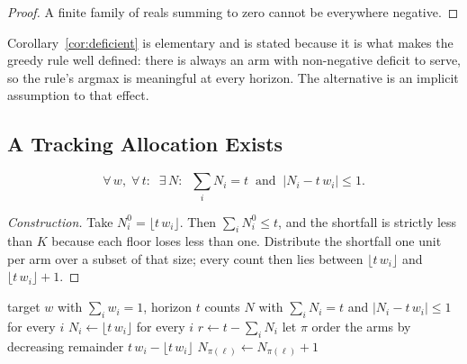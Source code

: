 \begin{proof}
A finite family of reals summing to zero cannot be everywhere negative.
\end{proof}


Corollary~\ref{cor:deficient} is elementary and is stated because it is what makes the greedy
rule well defined: there is always an arm with non-negative deficit to serve, so the rule's
argmax is meaningful at every horizon. The alternative is an implicit assumption to that
effect.

\subsection{A Tracking Allocation Exists}
\label{sec:exists}

\begin{theorem}
\label{thm:exists}
\begin{equation}
\forall\,w,\;\forall\,t:\;\;
\exists\,N:\;\;\sum_{i} N_{i}=t
\;\;\text{and}\;\;\bigl|N_{i}-t\,w_{i}\bigr|\leq 1 .
\label{eq:exists}
\end{equation}
\end{theorem}

\begin{proof}[Construction]
Take $N_{i}^{0}=\lfloor t\,w_{i}\rfloor$. Then $\sum_{i}N_{i}^{0}\le t$, and the shortfall is
strictly less than $K$ because each floor loses less than one. Distribute the shortfall one
unit per arm over a subset of that size; every count then lies between
$\lfloor t\,w_{i}\rfloor$ and $\lfloor t\,w_{i}\rfloor+1$.
\end{proof}

\begin{algorithm}[htbp]
\caption{Offline allocation meeting the quota bound at a fixed horizon}
\label{alg:offline}
\begin{algorithmic}[1]
\REQUIRE target $w$ with $\sum_{i}w_{i}=1$, horizon $t$
\ENSURE counts $N$ with $\sum_{i}N_{i}=t$ and $|N_{i}-t\,w_{i}|\le1$ for every $i$
\STATE $N_{i}\leftarrow\lfloor t\,w_{i}\rfloor$ for every $i$
\STATE $r\leftarrow t-\sum_{i}N_{i}$ 
\STATE let $\pi$ order the arms by decreasing remainder $t\,w_{i}-\lfloor t\,w_{i}\rfloor$
  \STATE $N_{\pi(\ell)}\leftarrow N_{\pi(\ell)}+1$
\ENDFOR
\end{algorithmic}
\end{algorithm}

